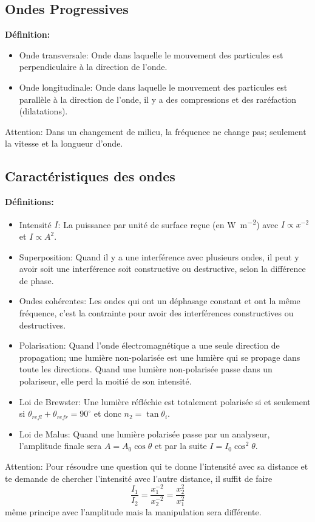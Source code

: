 \documentclass[french, a4paper, 12pt]{article}
\begin{document}
\subsection{Ondes Progressives}
\textbf{Définition:}
\begin{itemize}
\item Onde transversale: Onde dans laquelle le mouvement des particules est perpendiculaire à la direction de l'onde.
\item Onde longitudinale: Onde dans laquelle le mouvement des particules est parallèle à la direction de l'onde, il y a des compressions et des raréfaction (dilatations).
\end{itemize}
Attention: Dans un changement de milieu, la fréquence ne change pas; seulement la vitesse et la longueur d'onde.

\subsection{Caractéristiques des ondes}
\textbf{Définitions:}
\begin{itemize}
\item Intensité $I$: La puissance par unité de surface reçue (en \si{\watt\per\meter\squared}) avec $I \propto x^{-2}$ et $I \propto A^2$.
\item Superposition: Quand il y a une interférence avec plusieurs ondes, il peut y avoir soit une interférence soit constructive ou destructive, selon la différence de phase.
\item Ondes cohérentes: Les ondes qui ont un déphasage constant et ont la même fréquence, c'est la contrainte pour avoir des interférences constructives ou destructives.
\item Polarisation: Quand l'onde électromagnétique a une seule direction de propagation; une lumière non-polarisée est une lumière qui se propage dans toute les directions. Quand une lumière non-polarisée passe dans un polariseur, elle perd la moitié de son intensité.
\item Loi de Brewster: Une lumière réfléchie est totalement polarisée si et seulement si $\theta _{refl}+\theta_{refr}=90^\circ$ et donc $n_2=\tan \theta _i$.
\item Loi de Malus: Quand une lumière polarisée passe par un analyseur, l'amplitude finale sera $A=A_0 \cos \theta$ et par la suite $I=I_0 \cos ^2 \theta$.
\end{itemize}
Attention: Pour résoudre une question qui te donne l'intensité avec sa distance et te demande de chercher l'intensité avec l'autre distance, il suffit de faire 
\[
\frac{I_1}{I_2}=\frac{x_1^{-2}}{x_2^{-2}}=\frac{x_2^2}{x_1^2}
\]
même principe avec l'amplitude mais la manipulation sera différente.
\end{document}
